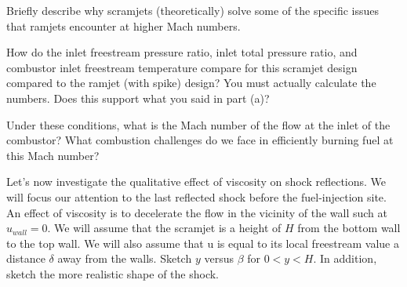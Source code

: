 \documentclass[../main.tex]{subfiles}
\begin{document}


Briefly describe why scramjets (theoretically) solve some of the specific issues that ramjets encounter at higher Mach numbers.


How do the inlet freestream pressure ratio, inlet total pressure ratio, and combustor inlet freestream temperature compare for this scramjet design compared to the ramjet (with spike) design? 
You must actually calculate the numbers. 
Does this support what you said in part (a)?


Under these conditions, what is the Mach number of the flow at the inlet of the combustor? 
What combustion challenges do we face in efficiently burning fuel at this Mach number?


Let's now investigate the qualitative effect of viscosity on shock reflections.
We will focus our attention to the last reflected shock before the fuel-injection site.
An effect of viscosity is to decelerate the flow in the vicinity of the wall such at \(u_{wall}=0\).
We will assume that the scramjet is a height of \(H\) from the bottom wall to the top wall.
We will also assume that u is equal to its local freestream value a distance \(\delta\) away from the walls.
Sketch \(y\) versus \(\beta\) for \(0<y<H\).
In addition, sketch the more realistic shape of the shock.
\end{document}

